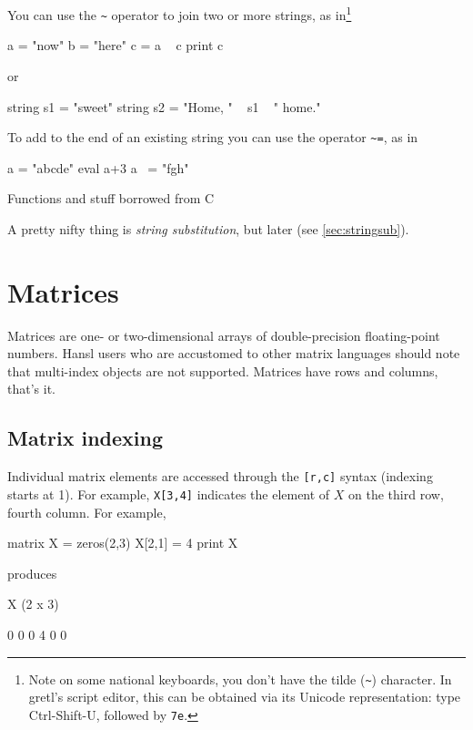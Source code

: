 You can use the \verb|~| operator to join two or more strings, as
in\footnote{Note on some national keyboards, you don't have the tilde
  (\texttt{\~}) character. In gretl's script editor, this can be
  obtained via its Unicode representation: type Ctrl-Shift-U, followed
  by \texttt{7e}.}
\begin{code}
  a = "now"
  b = "here"
  c = a ~ c
  print c
\end{code}
or
\begin{code}
string s1 = "sweet"
string s2 = "Home, " ~ s1 ~ " home."
\end{code}

To add to the end of an existing string you can use the operator
\verb|~=|, as in
\begin{code}
  a = "abcde"
  eval a+3
  a ~= "fgh"
\end{code}

Functions and stuff borrowed from C

A pretty nifty thing is \emph{string substitution}, but later (see
\ref{sec:stringsub}).

\chapter{Matrices}

Matrices are one- or two-dimensional arrays of double-precision
floating-point numbers. Hansl users who are accustomed to other matrix
languages should note that multi-index objects are not
supported. Matrices have rows and columns, that's it.

\section{Matrix indexing}
\label{sec:mat-index}

Individual matrix elements are accessed through the \verb|[r,c]|
syntax (indexing starts at 1). For example, \texttt{X[3,4]} indicates
the element of $X$ on the third row, fourth column. For example,
\begin{code}
  matrix X = zeros(2,3)
  X[2,1] = 4
  print X
\end{code}
produces
\begin{code}
X (2 x 3)

  0   0   0 
  4   0   0 
\end{code}

